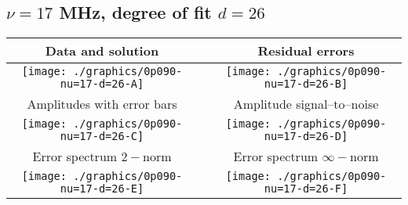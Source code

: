 

% 

\clearpage{}
\break{}

\subsection{$\nu = 17$ MHz, degree of fit $d = 26$}

\begin{table}[h]
    \begin{center}
        \begin{tabular}{ccc}
            Data and solution & \quad & Residual errors \\\hline
            \texttt{[image: ./graphics/0p090-nu=17-d=26-A]} &&
            \texttt{[image: ./graphics/0p090-nu=17-d=26-B]} \\[15pt]
            Amplitudes with error bars && Amplitude signal--to--noise \\\hline
            \texttt{[image: ./graphics/0p090-nu=17-d=26-C]} &&
            \texttt{[image: ./graphics/0p090-nu=17-d=26-D]} \\[15pt]
            Error spectrum $2-$norm && Error spectrum $\infty-$norm \\\hline
            \texttt{[image: ./graphics/0p090-nu=17-d=26-E]} &&
            \texttt{[image: ./graphics/0p090-nu=17-d=26-F]} \\[15pt]
        \end{tabular}
    \end{center}
\label{fig:elev=90, nu=17}
\end{table}



\endinput
